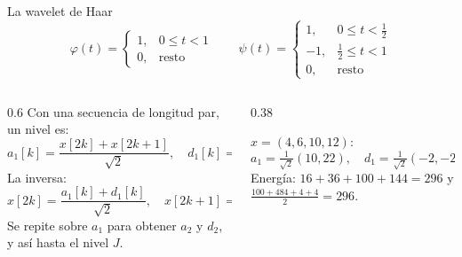 \documentclass[aspectratio=169,11pt]{beamer}
\begin{document}
\begin{frame}{La wavelet de Haar}
  \small
  \[
    \varphi(t)=\begin{cases}1,&0\le t<1\\0,&\text{resto}\end{cases}\qquad
    \psi(t)=\begin{cases}1,&0\le t<\tfrac12\\-1,&\tfrac12\le t<1\\0,&\text{resto}\end{cases}
  \]
  \begin{columns}[T]
    \begin{column}{0.6\textwidth}
      Con una secuencia de longitud par, un nivel es:
      \[
        a_1[k]=\frac{x[2k]+x[2k+1]}{\sqrt2},\quad d_1[k]=\frac{x[2k]-x[2k+1]}{\sqrt2}.
      \]
      La inversa:
      \[
        x[2k]=\frac{a_1[k]+d_1[k]}{\sqrt2},\quad x[2k+1]=\frac{a_1[k]-d_1[k]}{\sqrt2}.
      \]
      Se repite sobre $a_1$ para obtener $a_2$ y $d_2$, y así hasta el nivel $J$.
    \end{column}
    \begin{column}{0.38\textwidth}
      \begin{ejemplo}
        \footnotesize
        $x=(4,6,10,12)$:
        \[
          a_1=\tfrac1{\sqrt2}(10,22),\quad d_1=\tfrac1{\sqrt2}(-2,-2).
        \]
        Energía: $16+36+100+144=296$ y $\frac{100+484+4+4}{2}=296$.
      \end{ejemplo}
    \end{column}
  \end{columns}
\end{frame}
\end{document}

